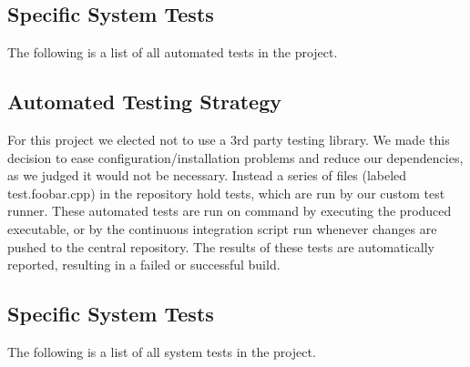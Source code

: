 \documentclass[12pt, titlepage]{article}
\begin{document}
	\subsection{Specific System Tests}
	The following is a list of all automated tests in the project.

	\subsection{Automated Testing Strategy}
	For this project we elected not to use a 3rd party testing library. We made this decision to ease configuration/installation problems and reduce our dependencies, as we judged it would not be necessary. Instead a series of files (labeled test.foobar.cpp) in the repository hold tests, which are run by our custom test runner. These automated tests are run on command by executing the produced executable, or by the continuous integration script run whenever changes are pushed to the central repository. The results of these tests are automatically reported, resulting in a failed or successful build.

	\subsection{Specific System Tests}
	The following is a list of all system tests in the project.
\end{document}
